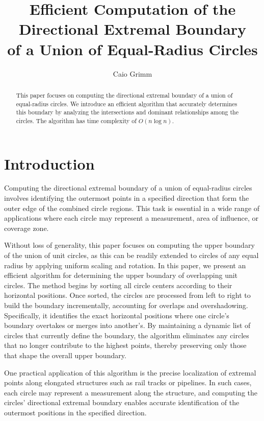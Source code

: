 \documentclass[12pt]{article}
\title{Efficient Computation of the Directional Extremal Boundary\\
of a Union of Equal-Radius Circles}
\author{Caio Grimm}
\begin{document}
	
\maketitle

\begin{abstract}
This paper focuses on computing the directional extremal boundary
of a union of equal-radius circles. We introduce an efficient algorithm
that accurately determines this boundary by analyzing the intersections and
dominant relationships among the circles. The algorithm has time complexity
of $O(n \log n)$.
\end{abstract}

\section{Introduction}
Computing the directional extremal boundary of a union of equal-radius circles involves
identifying the outermost points in a specified direction that form the outer edge of the
combined circle regions. This task is essential in a wide range of applications where each
circle may represent a measurement, area of influence, or coverage zone.

Without loss of generality, this paper focuses on computing the upper boundary of
the union of unit circles, as this can be readily extended to circles of any equal radius by
applying uniform scaling and rotation. In this paper, we present an efficient algorithm for
determining the upper boundary of overlapping unit circles. The method begins by sorting
all circle centers according to their horizontal positions. Once sorted, the circles are
processed from left to right to build the boundary incrementally, accounting for overlaps
and overshadowing. Specifically, it identifies the exact horizontal positions where one
circle's boundary overtakes or merges into another's. By maintaining a dynamic list of
circles that currently define the boundary, the algorithm eliminates any circles that no
longer contribute to the highest points, thereby preserving only those that shape the overall
upper boundary.

One practical application of this algorithm is the precise localization of extremal
points along elongated structures such as rail tracks or pipelines. In such cases, each
circle may represent a measurement along the structure, and computing the circles'
directional extremal boundary enables accurate identification of the outermost positions
in the specified direction.
\end{document}

